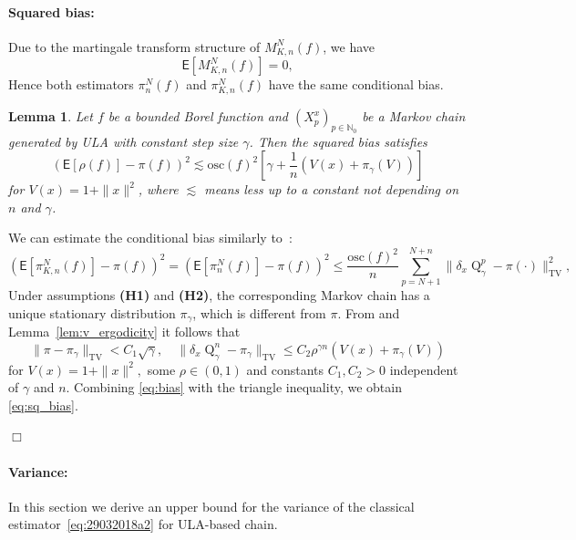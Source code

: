 \documentclass[bj]{imsart}
\def\nset{\mathbb{N}}
\newcommand{\proofendsign}{$\Box$}
\newtheorem{lem}[thm]{Lemma}
\newenvironment{proof}{{\noindent \bf Proof }}
 {{\hspace*{\fill}\proofendsign\par\bigskip}}
\newcommand{\tvnorm}[1]{\| #1 \|_{\operatorname{TV}}}
\def\kerULA{\operatorname{Q}}
\begin{document}
\paragraph{Squared bias:} Due to the martingale transform structure
of $M_{K,n}^N(f)$,
we have
\[
\mathsf E\left[M_{K,n}^N(f)\right]=0,
\]
Hence both estimators
$\pi_n^N(f)$ and $\pi_{K,n}^N(f)$ have the same conditional bias. 

\begin{lem} 
\label{lem:bias}
Let $f$ be a bounded Borel function and $(X^x_{p})_{p \in \nset_0}$ be a Markov chain generated by ULA with constant step size $\gamma$. Then the squared bias satisfies
\begin{equation}
\label{eq:sq_bias}
\left( \mathsf{E}[\rho(f)]-\pi(f)\right)^2 \lesssim \mathrm{osc}(f)^2 \left[\gamma + \frac{1}{n}\left(V(x) + \pi_{\gamma}(V)\right)\right]
\end{equation}
for $V(x) = 1 + \|x\|^2$, where $\lesssim$ means less up to a constant not depending on $n$ and $\gamma$.
\end{lem}

\begin{proof} We can estimate the conditional bias similarly to~\cite[Section~3]{durmus:moulines:2017}:
\begin{equation}
\label{eq:06042018a2}
\left( \mathsf{E}[\pi_{K,n}^N(f)]-\pi(f)\right)^2
=\left(\mathsf{E}[\pi_{n}^N(f)]-\pi(f)\right)^2
\le
\frac{\mathrm{osc}(f)^2}{n}\sum_{p=N+1}^{N+n}
\tvnorm{\delta_x \kerULA_\gamma^{p}-\pi(\cdot)}^2,
\end{equation}
Under assumptions {\bf (H1)} and {\bf (H2)}, the corresponding Markov chain has a unique stationary distribution $\pi_\gamma$, which is different from $\pi$. From \cite[Theorem~10]{durmus:moulines:2017} and Lemma~\ref{lem:v_ergodicity} it follows that
\begin{equation}
\label{eq:bias}
\tvnorm{\pi - \pi_\gamma} < C_1\sqrt{\gamma}, \quad \tvnorm{\delta_x\kerULA_{\gamma}^{n}-\pi_\gamma} \leq C_2\rho^{\gamma n}\left(V(x) + \pi_\gamma(V)\right)
\end{equation}
for  $V(x) = 1 + \|x\|^2,$ some $\rho\in (0,1)$ and constants $C_1,C_2>0$ independent of $\gamma$  and $n$. Combining \eqref{eq:bias} with the triangle inequality, we obtain \eqref{eq:sq_bias}.
\end{proof}

\paragraph{Variance:} In this section we derive an upper bound for the variance of the classical estimator~\eqref{eq:29032018a2} for ULA-based chain. 
\end{document}
